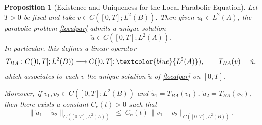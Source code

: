 \documentclass[reqno]{amsart}
\numberwithin{equation}{section}
\newtheorem{proposition}[theorem]{Proposition}
\begin{document}
\begin{proposition}[Existence and Uniqueness for the Local Parabolic Equation]
\label{EULocalp-e}
Let $T>0$ be fixed and take $v\in C([0,T];L^{2}(B))$.  
Then given $u_0\in L^2(A)$, the parabolic problem \eqref{localpar} admits a unique solution
\[
\tilde{u} \in C([0,T];L^2(A)).
\]
In particular, this defines a linear operator
\[
T_{BA} : C([0,T];L^{2}(B)) \longrightarrow C([0,T];\textcolor{blue}{L^{2}(A)}),
\qquad 
T_{BA}(v)=\tilde{u},
\]
which associates to each $v$ the unique solution $\tilde{u}$ of
\eqref{localpar} on $[0,T]$.

Moreover, if $v_{1},v_{2}\in C([0,T];L^{2}(B))$ and 
$\tilde{u}_{1}=T_{BA}(v_{1})$, $\tilde{u}_{2}=T_{BA}(v_{2})$, then there exists a constant
$C_e(t)>0$ such that
\begin{equation}\label{uvnormp-e}
    \|\tilde{u}_{1}-\tilde{u}_{2}\|_{C([0,T];L^{2}(A))}
    \;\le\;
    C_e(t)\,\|v_{1}-v_{2}\|_{C([0,T];L^{2}(B))}.
\end{equation}
\end{proposition}
\end{document}
